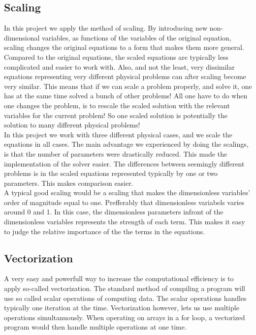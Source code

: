 \documentclass{article}
\begin{document}
\subsection{Scaling}
In this project we apply the method of scaling. By introducing new non-dimensional variables, as functions of the variables of the original equation, scaling changes the original equations to a form that makes them more general. Compared to the original equations, the scaled equations are typically less complicated and easier to work with. Also, and not the least, very dissimilar equations representing very different physical problems can after scaling become very similar. This means that if we can scale a problem properly, and solve it, one has at the same time solved a bunch of other problems! All one have to do when one changes the problem, is to rescale the scaled solution with the relevant variables for the current problem! So one scaled solution is potentially the solution to many different physical problems!\\

In this project we work with three different physical cases, and we scale the equations in all cases. The main advantage we experienced by doing the scalings, is that the number of parameters were drastically reduced. This made the implementation of the solver easier. The differences between seemingly different problems is in the scaled equations represented typically by one or two parameters. This makes comparison easier.\\

A typical good scaling would be a scaling that makes the dimensionless variables' order of magnitude equal to one. Prefferably that dimensionless variabels varies around 0 and 1. In this case, the dimensionless parameters infront of the dimensionless variables represents the strength of each term. This makes it easy to judge the relative importance of the the terms in the equations. 

\subsection{Vectorization}
A very easy and powerfull way to increase the computational efficiency is to apply so-called vectorization. The standard method of compiling a program will use so called scalar operations of computing data. The scalar operations handles typically one iteration at the time. Vectorization however, lets us use multiple operations simultanuously. When operating on arrays in a for loop, a vectorized program would then handle multiple operations at one time. \\
\end{document}
